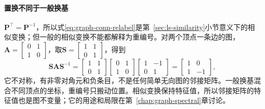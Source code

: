 \paragraph{置换不同于一般换基}
$\bm P^{\top}=\bm P^{-1}$，所以式\eqref{eq:graph-conn-relabel}是第~\ref{sec:ls-similarity}小节意义下的相似变换；但一般的相似变换不能都解释为重编号。对两个顶点一条边的图，$\bm A=\left[\begin{smallmatrix}0&1\\1&0\end{smallmatrix}\right]$，取$\bm S=\left[\begin{smallmatrix}1&1\\0&1\end{smallmatrix}\right]$，得到
\[
\bm S\bm A\bm S^{-1}
=\begin{bmatrix}1&1\\0&1\end{bmatrix}
\begin{bmatrix}0&1\\1&0\end{bmatrix}
\begin{bmatrix}1&-1\\0&1\end{bmatrix}
=\begin{bmatrix}1&0\\1&-1\end{bmatrix},
\]
它不对称，有非零对角元和负条目，不是任何简单无向图的邻接矩阵。一般换基混合不同顶点的坐标，重编号只搬动位置。相似变换保持特征值，所以邻接矩阵的特征值也是图不变量；它的用途和局限在第~\ref{chap:graph-spectral}章讨论。
